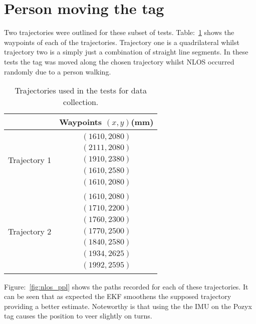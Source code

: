 \section{Person moving the tag}\label{sec:person-moving-the-tag}
Two trajectories were outlined for these subset of tests.
Table:~\ref{tb:trajs} shows the waypoints of each of the trajectories.
Trajectory one is a quadrilateral whilst trajectory two is a simply just a combination of straight line segments.
In these tests the tag was moved along the chosen trajectory whilst NLOS occurred randomly due to a person walking.
\begin{table}[ht!]
    \centering
    \begin{tabular}{|c|c|}
        \hline
        & Waypoints $(x,y)$(mm)\\
        \hline
        Trajectory 1 & $\begin{array}{c}
                            (1610, 2080)\\
                            (2111, 2080)\\
                            (1910, 2380)\\
                            (1610, 2580)\\
                            (1610, 2080)
        \end{array}$\\
        \hline
        Trajectory 2 & $\begin{array}{c}
                            (1610, 2080)\\
                            (1710, 2200)\\
                            (1760, 2300)\\
                            (1770, 2500)\\
                            (1840, 2580)\\
                            (1934, 2625)\\
                            (1992, 2595)
        \end{array}$\\
        \hline
    \end{tabular}
    \caption{Trajectories used in the tests for data collection.}
    \label{tb:trajs}
\end{table}
Figure:~\ref{fig:nlos_ppl} shows the paths recorded for each of these trajectories.
It can be seen that as expected the EKF smoothens the supposed trajectory providing a better estimate.
Noteworthy is that using the the IMU on the Pozyx tag causes the position to veer slightly on turns.
